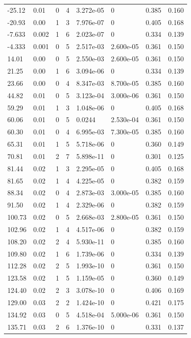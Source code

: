 \documentclass[preview]{standalone}
\begin{document}
{{\begin{tabular}{L{1.2cm}C{1.2cm} C{0.3cm}C{0.5cm} C{1.4cm}C{1.4cm} C{1.4cm}C{1.4cm}}
  -25.12  &  0.01  & 0     &  4 &  3.272e-05  & 0  & 0.385 &  0.160   \\ 
  -20.93  &  0.00  & 1     &  3 &  7.976e-07  & 0  & 0.405 &  0.168   \\ 
  -7.633  &  0.002  & 1     &  6 &  2.023e-07  & 0  & 0.334 &  0.139   \\ 
  -4.333  &  0.001  & 0     &  5 &  2.517e-03  & 2.600e-05  & 0.361 &  0.150   \\ 
  14.01  &  0.00  & 0     &  5 &  2.550e-03  & 2.600e-05  & 0.361 &  0.150   \\ 
  21.25  &  0.00  & 1     &  6 &  3.094e-06  & 0  & 0.334 &  0.139   \\ 
  23.66  &  0.00  & 0     &  4 &  8.347e-03  & 8.700e-05  & 0.385 &  0.160   \\ 
  44.82  &  0.01  & 0     &  5 &  3.123e-04  & 3.000e-06  & 0.361 &  0.150   \\ 
  59.29  &  0.01  & 1     &  3 &  1.048e-06  & 0  & 0.405 &  0.168   \\ 
  60.06  &  0.01  & 0     &  5 &  0.0244  & 2.530e-04  & 0.361 &  0.150   \\ 
  60.30  &  0.01  & 0     &  4 &  6.995e-03  & 7.300e-05  & 0.385 &  0.160   \\ 
  65.31  &  0.01  & 1     &  5 &  5.718e-06  & 0  & 0.360 &  0.149   \\ 
  70.81  &  0.01  & 2     &  7 &  5.898e-11  & 0  & 0.301 &  0.125   \\ 
  81.44  &  0.02  & 1     &  3 &  2.295e-05  & 0  & 0.405 &  0.168   \\ 
  81.65  &  0.02  & 1     &  4 &  4.225e-05  & 0  & 0.382 &  0.159   \\ 
  88.34  &  0.02  & 0     &  4 &  2.873e-03  & 3.000e-05  & 0.385 &  0.160   \\ 
  91.50  &  0.02  & 1     &  4 &  2.329e-06  & 0  & 0.382 &  0.159   \\ 
  100.73  &  0.02  & 0     &  5 &  2.668e-03  & 2.800e-05  & 0.361 &  0.150   \\ 
  102.96  &  0.02  & 1     &  4 &  4.517e-06  & 0  & 0.382 &  0.159   \\ 
  108.20  &  0.02  & 2     &  4 &  5.930e-11  & 0  & 0.385 &  0.160   \\ 
  109.80  &  0.02  & 1     &  6 &  1.739e-06  & 0  & 0.334 &  0.139   \\ 
  112.28  &  0.02  & 2     &  5 &  1.993e-10  & 0  & 0.361 &  0.150   \\ 
  123.58  &  0.02  & 1     &  5 &  1.159e-05  & 0  & 0.360 &  0.149   \\ 
  124.40  &  0.02  & 2     &  3 &  3.078e-10  & 0  & 0.406 &  0.169   \\ 
  129.00  &  0.03  & 2     &  2 &  1.424e-10  & 0  & 0.421 &  0.175   \\ 
  134.92  &  0.03  & 0     &  5 &  4.518e-04  & 5.000e-06  & 0.361 &  0.150   \\ 
  135.71  &  0.03  & 2     &  6 &  1.376e-10  & 0  & 0.331 &  0.137   \\ 
\hline 
\end{tabular} 

}}
\end{document}
